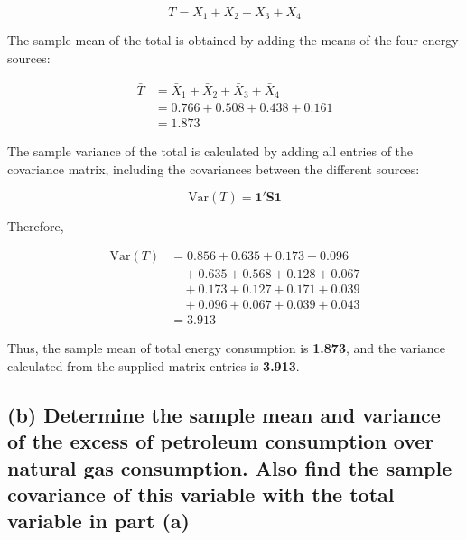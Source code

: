 \documentclass[12pt]{article}
\begin{document}
\vspace{0.2cm}

\[
T = X_1 + X_2 + X_3 + X_4
\]

\vspace{0.2cm}

The sample mean of the total is obtained by adding the means of the four energy sources:

\vspace{0.2cm}

\begin{align*}
\bar{T} &= \bar{X}_1 + \bar{X}_2 + \bar{X}_3 + \bar{X}_4 \\
&= 0.766 + 0.508 + 0.438 + 0.161 \\
&= \boxed{1.873}
\end{align*}

\vspace{0.2cm}

The sample variance of the total is calculated by adding all entries of the covariance matrix, including the covariances between the different sources:

\vspace{0.2cm}

\[
\text{Var}(T) = \mathbf{1}' \mathbf{S} \mathbf{1}
\]

\vspace{0.2cm}

Therefore,

\vspace{0.2cm}

\begin{align*}
\text{Var}(T) &= 0.856 + 0.635 + 0.173 + 0.096 \\
&\quad + 0.635 + 0.568 + 0.128 + 0.067 \\
&\quad + 0.173 + 0.127 + 0.171 + 0.039 \\
&\quad + 0.096 + 0.067 + 0.039 + 0.043 \\
&= \boxed{3.913}
\end{align*}

\vspace{0.2cm}

Thus, the sample mean of total energy consumption is \textbf{1.873}, and the variance calculated from the supplied matrix entries is \textbf{3.913}.

\vspace{0.7cm}

\subsection*{(b) Determine the sample mean and variance of the excess of petroleum consumption over natural gas consumption. Also find the sample covariance of this variable with the total variable in part (a)}
\end{document}
